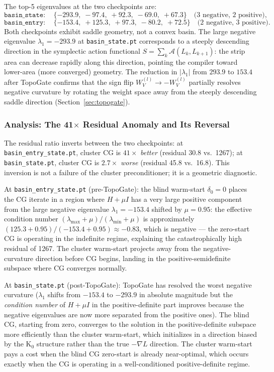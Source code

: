 \documentclass[11pt]{amsart}
\begin{document}
The top-5 eigenvalues at the two checkpoints are:
\[
  \texttt{basin\_state}: \quad
  \{-293.9,\;-97.4,\;{+}92.3,\;-69.0,\;{+}67.3\}
  \quad\text{(3 negative, 2 positive)},
\]
\[
  \texttt{basin\_entry}: \quad
  \{-153.4,\;{+}125.3,\;{+}97.3,\;-80.2,\;{+}72.5\}
  \quad\text{(2 negative, 3 positive)}.
\]
Both checkpoints exhibit saddle geometry, not a convex basin.
The large negative eigenvalue $\lambda_1 = -293.9$ at
\texttt{basin\_state.pt} corresponds to a steeply descending
direction in the symplectic action functional
$S = \sum_k \mathcal{A}(L_k, L_{k+1})$: the strip area can decrease
rapidly along this direction, pointing the compiler toward
lower-area (more converged) geometry.
The reduction in $|\lambda_1|$ from $293.9$ to $153.4$ after
TopoGate confirms that the sign flip
$W_V^{(l)} \to -W_V^{(l)}$ partially resolves negative curvature
by rotating the weight space away from the steeply descending
saddle direction (Section~\ref{sec:topogate}).

\subsubsection*{Analysis: The 41$\times$ Residual Anomaly and Its Reversal}

The residual ratio inverts between the two checkpoints:
at \texttt{basin\_entry\_state.pt}, cluster CG is $41\times$
\emph{better} (residual 30.8 vs.\ 1267);
at \texttt{basin\_state.pt}, cluster CG is $2.7\times$
\emph{worse} (residual 45.8 vs.\ 16.8).
This inversion is not a failure of the cluster preconditioner;
it is a geometric diagnostic.

At \texttt{basin\_entry\_state.pt} (pre-TopoGate):
the blind warm-start $\delta_0 = 0$ places the CG iterate in a region
where $H + \mu I$ has a very large positive component from the
large negative eigenvalue $\lambda_1 = -153.4$ shifted by $\mu = 0.95$:
the effective condition number $(\lambda_{\max} + \mu) / (\lambda_{\min} + \mu)$
is approximately $(125.3 + 0.95) / (-153.4 + 0.95) \approx -0.83$,
which is negative --- the zero-start CG is operating in the indefinite
regime, explaining the catastrophically high residual of 1267.
The cluster warm-start projects away from the negative-curvature direction
before CG begins, landing in the positive-semidefinite subspace where CG
converges normally.

At \texttt{basin\_state.pt} (post-TopoGate):
TopoGate has resolved the worst negative curvature ($\lambda_1$ shifts
from $-153.4$ to $-293.9$ in absolute magnitude but the \emph{condition number}
of $H + \mu I$ in the positive-definite part improves because the
negative eigenvalues are now more separated from the positive ones).
The blind CG, starting from zero, converges to the solution in the
positive-definite subspace more efficiently than the cluster warm-start,
which initializes in a direction biased by the K$_0$ structure rather
than the true $-\nabla L$ direction.
The cluster warm-start pays a cost when the blind CG zero-start is
already near-optimal, which occurs exactly when the CG is operating in
a well-conditioned positive-definite regime.
\end{document}
